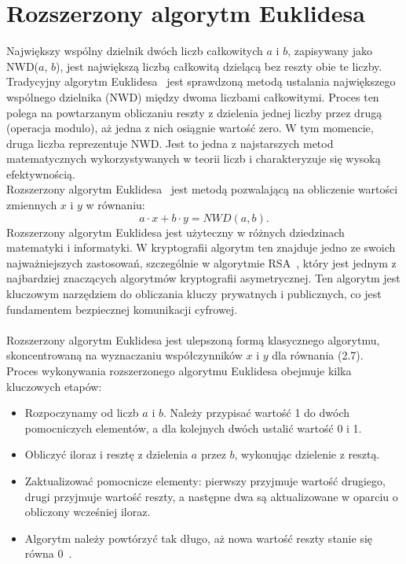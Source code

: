 \documentclass{SGGW-thesis}
\begin{document}
	\section{Rozszerzony algorytm Euklidesa}
	Największy wspólny dzielnik dwóch liczb całkowitych \( a \) i \( b \), zapisywany jako NWD(\( a \), \( b \)), jest największą liczbą całkowitą dzielącą bez reszty obie te liczby.
	\vspace{1em}
	\\
	\noindent Tradycyjny algorytm Euklidesa~\cite{ajakubiec}\cite{r24modulo}\cite{grygiel} jest sprawdzoną metodą ustalania największego wspólnego dzielnika (NWD) między dwoma liczbami całkowitymi. Proces ten polega na powtarzanym obliczaniu reszty z dzielenia jednej liczby przez drugą (operacja modulo), aż jedna z nich osiągnie wartość zero. W tym momencie, druga liczba reprezentuje NWD. Jest to jedna z najstarszych metod matematycznych wykorzystywanych w teorii liczb i charakteryzuje się wysoką efektywnością.
	\vspace{1em}
	\\
	Rozszerzony algorytm Euklidesa~\cite{ajakubiec}\cite{r24modulo}\cite{grygiel} jest metodą pozwalającą na obliczenie wartości zmiennych \( x \) i \( y \) w równaniu:
	\begin{equation}
		a \cdot x + b \cdot y = NWD(a, b).
	\end{equation}
	Rozszerzony algorytm Euklidesa jest użyteczny w różnych dziedzinach matematyki i informatyki. W kryptografii algorytm ten znajduje jedno ze swoich najważniejszych zastosowań, szczególnie w algorytmie RSA~\cite{rsa}, który jest jednym z najbardziej znaczących algorytmów kryptografii asymetrycznej. Ten algorytm jest kluczowym narzędziem do obliczania kluczy prywatnych i publicznych, co jest fundamentem bezpiecznej komunikacji cyfrowej.
	\\
	\\
	\noindent Rozszerzony algorytm Euklidesa jest ulepszoną formą klasycznego algorytmu, skoncentrowaną na wyznaczaniu współczynników \( x \) i \( y \) dla równania (2.7).
	\vspace{1em}
	\\
	Proces wykonywania rozszerzonego algorytmu Euklidesa obejmuje kilka kluczowych etapów:
	\begin{itemize}
		\item Rozpoczynamy od liczb \( a \) i \( b \). Należy przypisać wartość 1 do dwóch pomocniczych elementów, a dla kolejnych dwóch ustalić wartość 0 i 1.
		\item Obliczyć iloraz i resztę z dzielenia \( a \) przez \( b \), wykonując dzielenie z resztą.
		\item Zaktualizować pomocnicze elementy: pierwszy przyjmuje wartość drugiego, drugi przyjmuje wartość reszty, a następne dwa są aktualizowane w oparciu o obliczony wcześniej iloraz.
		\item Algorytm należy powtórzyć tak długo, aż nowa wartość reszty stanie się równa 0~\cite{grygiel}.
	\end{itemize}
	\newpage
	
\end{document}
